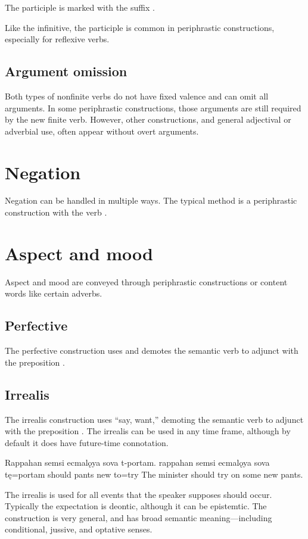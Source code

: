 The participle is marked with the suffix .

Like the infinitive, the participle is common in periphrastic constructions, especially for reflexive verbs.

\subsection{Argument omission} \label{sub:nonfinite_argument_omission}
Both types of nonfinite verbs do not have fixed valence and can omit all arguments. In some periphrastic constructions, those arguments are still required by the new finite verb. However, other constructions, and general adjectival or adverbial use, often appear without overt arguments.

\section{Negation}
Negation can be handled in multiple ways. The typical method is a periphrastic construction with the verb .

\section{Aspect and mood}
Aspect and mood are conveyed through periphrastic constructions or content words like certain adverbs.

\subsection{Perfective}
The perfective construction uses  and demotes the semantic verb to adjunct with the preposition .

\subsection{Irrealis}
The irrealis construction uses  “say, want,” demoting the semantic verb to adjunct with the preposition . The irrealis can be used in any time frame, although by default it does have future-time connotation.

\begin{example}
	\script Rappahan semsi ecmalǫya sova t-portam.
	\bits rappahan semsi ecmalǫya sova tę=portam
	 should pants new to=try
	\tr The minister should try on some new pants. 
\end{example}

The irrealis is used for all events that the speaker supposes should occur. Typically the expectation is deontic, although it can be epistemtic. The construction is very general, and has broad semantic meaning---including conditional, jussive, and optative senses.